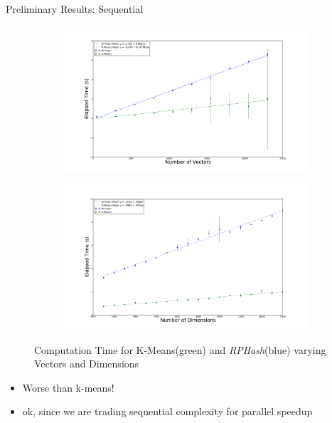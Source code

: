 \documentclass{beamer}
\begin{document}
\begin{frame}{Preliminary Results: Sequential}
\begin{figure}
 
        \begin{subfigure}
	  \centering \includegraphics[scale=.10]{doc/TimevaryPart}
        \end{subfigure}
        \begin{subfigure}
                \centering \includegraphics[scale=.10]{doc/TimevaryDim}
        \end{subfigure}
	  \caption{Computation Time for K-Means(green) and \emph{RPHash}(blue) 
               varying Vectors and Dimensions}\label{timecomplex}
\end{figure}
\begin{itemize}
 \item Worse than k-means!
 \item ok, since we are trading sequential complexity for parallel speedup
\end{itemize}

\end{frame}
\end{document}
